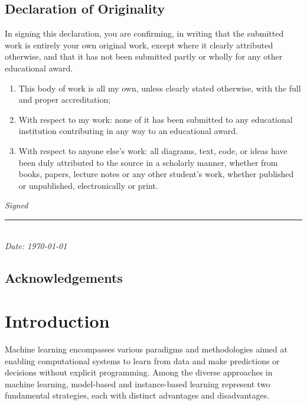 \documentclass[a4paper, 12pt]{report}
\begin{document}
\section*{Declaration of Originality}
In signing this declaration, you are confirming, in writing that the submitted
work is entirely your own original work, except where it clearly attributed otherwise,
and that it has not been submitted partly or wholly for any other educational award.
\begin{enumerate}
	\item This body of work is all my own, unless clearly stated otherwise, with the full and proper accreditation;
	\item With respect to my work: none of it has been submitted to any educational institution contributing in any way to an educational award.
	\item With respect to anyone else's work: all diagrams, text, code, or ideas have been duly attributed to the source in a scholarly manner,
	      whether from books, papers, lecture notes or any other student's work, whether published or unpublished, electronically or print.
\end{enumerate}

\vspace{2em} %

\begin{flushright}
	\textit{Signed} \\
	\rule{6cm}{0.4pt} \\
	\textit{Date: \today}
\end{flushright}

\section*{Acknowledgements}


\tableofcontents

\listoffigures

\listoftables

\raggedright
\chapter{Introduction}
\label{ch:introduction}

Machine learning encompasses various paradigms and methodologies aimed at enabling computational systems to learn from data and make predictions or decisions without explicit programming.
Among the diverse approaches in machine learning, model-based and instance-based learning represent two fundamental strategies, each with distinct advantages and disadvantages.
\end{document}
